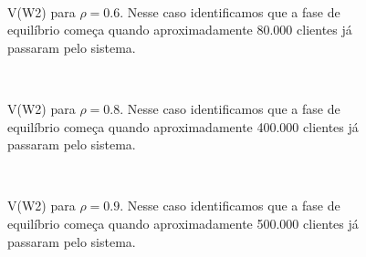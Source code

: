 \begin{figure}[htb!]
    \\
   \caption{V(W2) para $\rho=0.6$. Nesse caso identificamos que a fase de equilíbrio começa quando aproximadamente 80.000 clientes já passaram pelo sistema.}
\end{figure}

\begin{figure}[htb!]
    \\
   \caption{V(W2) para $\rho=0.8$. Nesse caso identificamos que a fase de equilíbrio começa quando aproximadamente 400.000 clientes já passaram pelo sistema.}
\end{figure}

\begin{figure}[htb!]
    \\
   \caption{V(W2) para $\rho=0.9$. Nesse caso identificamos que a fase de equilíbrio começa quando aproximadamente 500.000 clientes já passaram pelo sistema.}
\end{figure}
